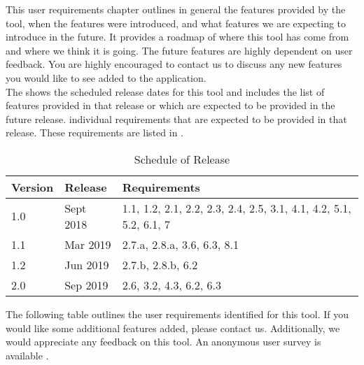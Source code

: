 This user requirements chapter outlines in general the features provided by the tool, when the features were introduced, and what features we are expecting to introduce in the future. It provides a roadmap of where this tool has come from and where we think it is going. The future features are highly dependent on user feedback. You are highly encouraged to contact us to discuss any new features you would like to see added to the application. \\

The  shows the scheduled release dates for this tool and includes the list of features provided in that release or which are expected to be provided in the future release. individual requirements that are expected to be provided in that release. These requirements are listed in .

\begin{table}[hbt!]                    
  \centering
\begin{adjustbox}{max width=\textwidth}            
  \begin{tabular}{lll}                    
    \toprule          
      Version & 	Release	 & Requirements \\  \hline
      1.0	& Sept 2018 &	1.1, 1.2, 2.1, 2.2, 2.3, 2.4, 2.5, 3.1, 4.1, 4.2, 5.1, 5.2, 6.1, 7\\  \hline
      1.1	 & Mar 2019 &	2.7.a, 2.8.a, 3.6, 6.3, 8.1\\  \hline
      1.2	 & Jun 2019 &	2.7.b, 2.8.b, 6.2 \\  \hline
      2.0	 & Sep 2019 &	2.6, 3.2, 4.3, 6.2, 6.3\\  \hline
  \end{tabular}
\end{adjustbox}
  \caption{Schedule of Release}             
  \label{tab:schedule}                 
\end{table}

The following table outlines the user requirements identified for this
tool. If you would like some additional features added, please contact us.
Additionally, we would appreciate any feedback on this tool. An anonymous
user survey is available .


